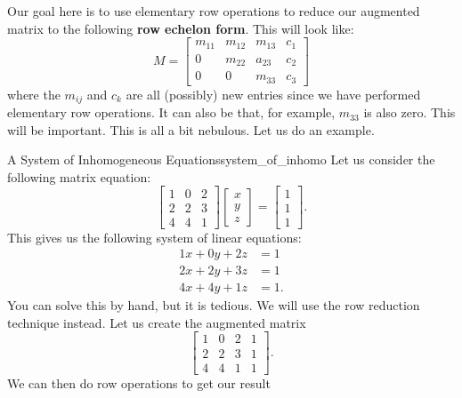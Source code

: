         Our goal here is to use elementary row operations to reduce our augmented matrix to the following \textbf{row echelon form}.  This will look like:
        \[
        M=\left[\begin{array}{ccc|c}
        m_{11} & m_{12} & m_{13}  &  c_1 \\
        0 & m_{22} & a_{23} & c_2\\
        0 & 0 & m_{33} & c_3
        \end{array}\right]
        \]
        where the $m_{ij}$ and $c_k$ are all (possibly) new entries since we have performed elementary row operations.  It can also be that, for example, $m_{33}$ is also zero. This will be important. This is all a bit nebulous. Let us do an example. 
        
        \begin{ex}{A System of Inhomogeneous Equations}{system_of_inhomo}
        Let us consider the following matrix equation:
        \[
        \begin{bmatrix}
        1 & 0 & 2\\
        2 & 2 & 3\\
        4 & 4 & 1
        \end{bmatrix}
        \begin{bmatrix}
        x\\
        y\\
        z
        \end{bmatrix}
        =\begin{bmatrix}
        1\\
        1\\
        1
        \end{bmatrix}.
        \]
        This gives us the following system of linear equations:
        \begin{align*}
            1x+0y+2z&=1\\
            2x+2y+3z&=1\\
            4x+4y+1z&=1.
        \end{align*}
        You can solve this by hand, but it is tedious.  We will use the row reduction technique instead.  Let us create the augmented matrix
        \[
        \left[\begin{array}{ccc|c}
        1 & 0 & 2 & 1 \\
        2 & 2 & 3 & 1 \\
        4 & 4 & 1 & 1
        \end{array}\right].
        \]
        We can then do row operations to get our result

\end{ex}
